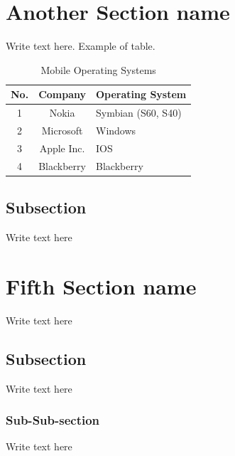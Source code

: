 \documentclass[12pt]{article}
\begin{document}
\section{Another Section name}
Write text here. Example of table.
\begin{table}[H]
\begin{center}
\begin{tabular}{|c|c|p{4cm}|}
 \hline
 \textbf{No.} & \textbf{Company} & \textbf{Operating System} \\
 \hline
 1 & Nokia & Symbian (S60, S40) \\
 \hline
 2 & Microsoft & Windows \\
 \hline
 3 & Apple Inc. & IOS \\
 \hline
 4 & Blackberry & Blackberry \\
 \hline
\end{tabular}
 \caption{Mobile Operating Systems}
 \end{center}
\end{table}

\subsection{Subsection}
Write text here


\section{Fifth Section name}
Write text here

\subsection{Subsection}
Write text here

\subsubsection{Sub-Sub-section}
Write text here



\end{document}
